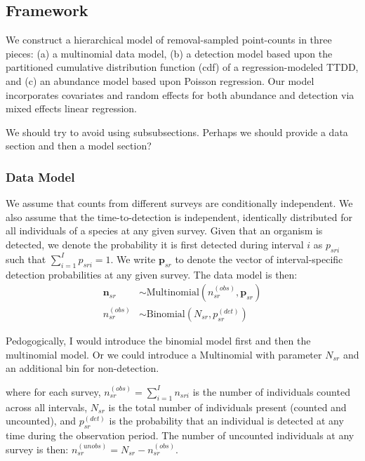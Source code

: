 \documentclass[useAMS,usenatbib,referee,12pt]{article}
\newcommand{\jarad}[1]{{\color{red} #1}}
\newcommand{\vn}{\textbf{n}}
\begin{document}
\subsection{Framework}

We construct a hierarchical model of removal-sampled point-counts in three pieces: (a) a multinomial data model, (b) a detection model based upon the partitioned cumulative distribution function (cdf) of a regression-modeled TTDD, and (c) an abundance model based upon Poisson regression.  Our model incorporates covariates and random effects for both abundance and detection via mixed effects linear regression.

\jarad{We should try to avoid using subsubsections. Perhaps we should provide a data section and then a model section?}

\subsubsection{Data Model}
We assume that counts from different surveys are conditionally independent.  We also assume that the time-to-detection is independent, identically distributed for all individuals of a species at any given survey.  Given that an organism is detected, we denote the probability it is first detected during interval $i$ as $p_{sri}$ such that $\sum_{i=1}^I p_{sri} = 1$.  We write $\textbf{p}_{sr}$ to denote the vector of interval-specific detection probabilities at any given survey.  The data model is then:
\begin{align}\label{eq:datamodel}
\vn_{sr} &\sim \mbox{Multinomial}\left(n_{sr}^{(obs)}, \textbf{p}_{sr}\right)\\
n_{sr}^{(obs)} &\sim \mbox{Binomial}\left(N_{sr}, p_{sr}^{(det)}\right)
\end{align}

\jarad{Pedogogically, I would introduce the binomial model first and then the multinomial model. Or we could introduce a Multinomial with parameter $N_{sr}$ and an additional bin for non-detection.}

where for each survey, $n_{sr}^{(obs)} = \sum_{i=1}^I n_{sri}$ is the number of individuals counted across all intervals, $N_{sr}$ is the total number of individuals present (counted and uncounted), and $p_{sr}^{(det)}$ is the probability that an individual is detected at any time during the observation period.  The number of uncounted individuals at any survey is then: $n_{sr}^{(unobs)} = N_{sr} - n_{sr}^{(obs)}$.
\end{document}
